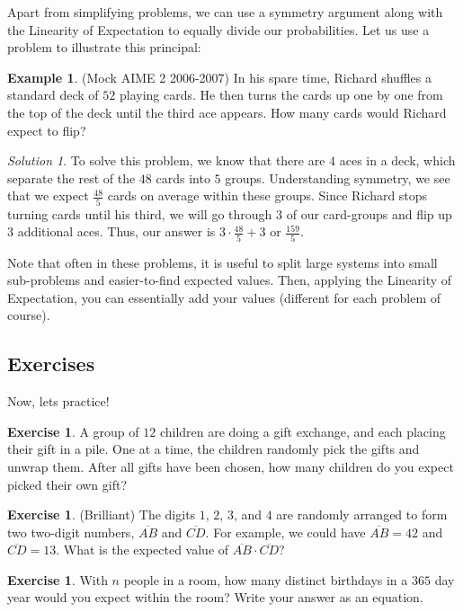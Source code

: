\documentclass[letterpaper]{article}
\theoremstyle{definition}
\newtheorem{example}[thm]{Example}
\theoremstyle{remark}
\newtheorem*{solution}{Solution}
\theoremstyle{definition}
\newtheorem{exercise}[thm]{Exercise}
\begin{document}
\noindent
Apart from simplifying problems, we can use a symmetry argument along with the Linearity of Expectation to equally divide our probabilities. Let us use a problem to illustrate this principal:

\begin{example}
(Mock AIME 2 2006-2007) In his spare time, Richard shuffles a standard deck of $52$ playing cards. He then turns the cards up one by one from the top of the deck until the third ace appears. How many cards would Richard expect to flip?
\end{example}

\begin{solution}
To solve this problem, we know that there are $4$ aces in a deck, which separate the rest of the $48$ cards into $5$ groups. Understanding symmetry, we see that we expect $\frac{48}{5}$ cards on average within these groups. Since Richard stops turning cards until his third, we will go through $3$ of our card-groups and flip up $3$ additional aces. Thus, our answer is $3\cdot\frac{48}{5} + 3$ or $\frac{159}{5}$.
\end{solution}

Note that often in these problems, it is useful to split large systems into small sub-problems and easier-to-find expected values. Then, applying the Linearity of Expectation, you can essentially add your values (different for each problem of course).

\subsection*{Exercises}
Now, lets practice!

\begin{exercise}
    A group of $12$ children are doing a gift exchange, and each placing their gift in a pile. One at a time, the children randomly pick the gifts and unwrap them. After all gifts have been chosen, how many children do you expect picked their own gift?
\end{exercise}

\begin{exercise}
    (Brilliant) The digits $1$, $2$, $3$, and $4$ are randomly arranged to form two two-digit numbers, $\overline{AB}$ and $\overline{CD}$. For example, we could have $\overline{AB} = 42$ and $\overline{CD} = 13$. What is the expected value of $\overline{AB}\cdot \overline{CD}$? 
\end{exercise}

\begin{exercise}
    With $n$ people in a room, how many distinct birthdays in a $365$ day year would you expect within the room? Write your answer as an equation.
\end{exercise}
\end{document}
